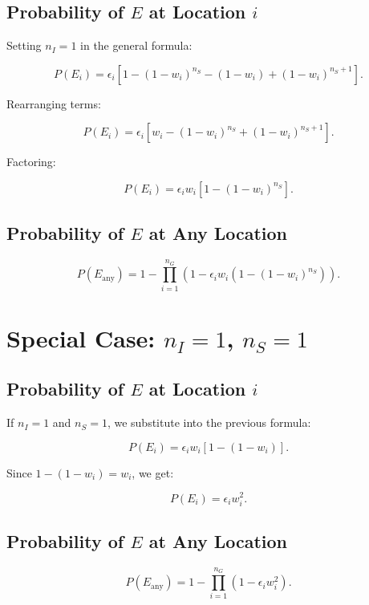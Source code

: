 \documentclass[11pt]{article}
\begin{document}
\subsection{Probability of \( E \) at Location \( i \)}

Setting \( n_I = 1 \) in the general formula:

\[
P(E_i) = \epsilon_i \left[ 1 - (1 - w_i)^{n_S} - (1 - w_i) + (1 - w_i)^{n_S + 1} \right].
\]

Rearranging terms:

\[
P(E_i) = \epsilon_i \left[ w_i - (1 - w_i)^{n_S} + (1 - w_i)^{n_S + 1} \right].
\]

Factoring:

\[
P(E_i) = \epsilon_i w_i \left[ 1 - (1 - w_i)^{n_S} \right].
\]

\subsection{Probability of \( E \) at Any Location}

\[
P(E_{\text{any}}) = 1 - \prod_{i=1}^{n_G} \left( 1 - \epsilon_i w_i \left( 1 - (1 - w_i)^{n_S} \right) \right).
\]

\section{Special Case: \( n_I = 1 \), \( n_S = 1 \)}

\subsection{Probability of \( E \) at Location \( i \)}

If \( n_I = 1 \) and \( n_S = 1 \), we substitute into the previous formula:

\[
P(E_i) = \epsilon_i w_i \left[ 1 - (1 - w_i) \right].
\]

Since \( 1 - (1 - w_i) = w_i \), we get:

\[
P(E_i) = \epsilon_i w_i^2.
\]

\subsection{Probability of \( E \) at Any Location}

\[
P(E_{\text{any}}) = 1 - \prod_{i=1}^{n_G} \left( 1 - \epsilon_i w_i^2 \right).
\]
\end{document}
